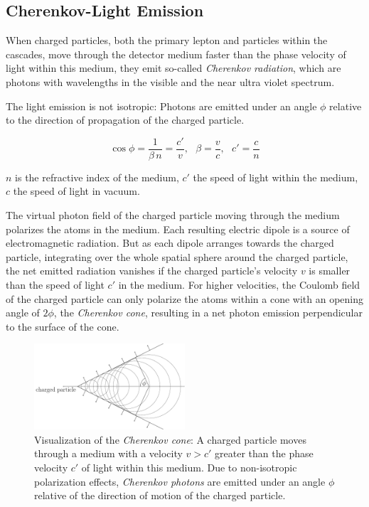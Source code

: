 \subsection{Cherenkov-Light Emission}
\label{sec:cherenkov}

When charged particles, both the primary lepton and particles within the
cascades, move through the detector medium faster than the phase
velocity of light within this medium, they emit so-called
\textit{Cherenkov radiation}, which are photons with wavelengths in the
visible and the near ultra violet spectrum.
\cite{energyreco, instrumentation, skysearch}

The light emission is not isotropic: Photons are emitted under an angle
\(\phi\) relative to the direction of propagation of the charged
particle. \cite{physiklexikon}

\[
  \cos \phi = \frac{1}{\beta\,n} = \frac{c'}{v}, \ \ \ \beta = \frac{v}{c}, \ \ \ c' = \frac{c}{n}
\]

\(n\) is the refractive index of the medium, \(c'\) the speed of light
within the medium, \(c\) the speed of light in vacuum.

The virtual photon field of the charged particle moving through the
medium polarizes the atoms in the medium. Each resulting electric dipole
is a source of electromagnetic radiation. But as each dipole arranges
towards the charged particle, integrating over the whole spatial sphere
around the charged particle, the net emitted radiation vanishes if the
charged particle's velocity \(v\) is smaller than the speed of light
\(c'\) in the medium. For higher velocities, the Coulomb field of the
charged particle can only polarize the atoms within a cone with an
opening angle of \(2\phi\), the \textit{Cherenkov cone}, resulting in a
net photon emission perpendicular to the surface of the cone.
\cite{physiklexikon}

\begin{figure}[htbp]
  \centering\includegraphics[width=0.5\textwidth]{img/cherenkov}
  \caption{Visualization of the \textit{Cherenkov cone}: A charged particle moves through a medium with a velocity $v>c'$ greater than the phase velocity $c'$ of light within this medium. Due to non-isotropic polarization effects, \textit{Cherenkov photons} are emitted under an angle $\phi$ relative of the direction of motion of the charged particle.}
  \label{fig:ehai2Ahj}
\end{figure}

